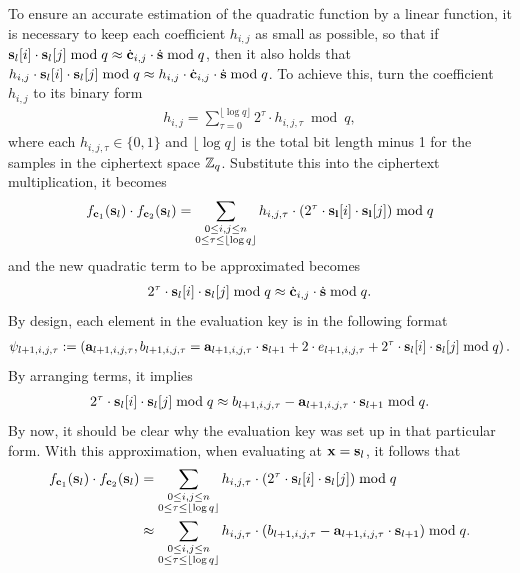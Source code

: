 \documentclass[../main.tex]{subfiles}
\begin{document}
To ensure an accurate estimation of the quadratic function by a linear function, it is necessary to keep each coefficient $h_{i,j}$ as small as possible, so that if $\mathbf{s}_l[i] \cdot \mathbf{s}_l[j] \bmod q \approx \dot{\mathbf{c}}_{i,j} \cdot \dot{\mathbf{s}} \bmod q$, then it also holds that $h_{i,j} \cdot \mathbf{s}_l[i] \cdot \mathbf{s}_l[j] \bmod q \approx h_{i,j} \cdot \dot{\mathbf{c}}_{i,j} \cdot \dot{\mathbf{s}} \bmod q$. To achieve this, turn the coefficient $h_{i,j}$ to its binary form  
\begin{align*}
    h_{i,j} = \sum_{\tau=0}^{\lfloor \log q \rfloor} 2^{\tau} \cdot h_{i,j,\tau} \bmod q,
\end{align*}
where each $h_{i,j,\tau} \in \{0,1\}$ and $\lfloor \log q \rfloor$ is the total bit length minus 1 for the samples in the ciphertext space $\mathbb{Z}_q$. Substitute this into the ciphertext multiplication, it becomes 
\begin{align}
\label{eq:homoMultQuad3}
    f_{\mathbf{c}_1}(\mathbf{s}_l) \cdot f_{\mathbf{c}_2}(\mathbf{s}_l) 
    = \sum_{\substack{0 \le i,j \le n \\ 0 \le \tau \le \lfloor \log q \rfloor}} h_{i,j,\tau} \cdot (2^{\tau} \cdot \mathbf{s_l}[i] \cdot \mathbf{s_l}[j]) \bmod q
\end{align}
and the new quadratic term to be approximated becomes 
\begin{align*}
    2^{\tau} \cdot \mathbf{s}_l[i] \cdot \mathbf{s}_l[j] \bmod q \approx \dot{\mathbf{c}}_{i,j} \cdot \dot{\mathbf{s}} \bmod q.
\end{align*}
By design, each element in the evaluation key is in the following format  
\begin{align*}
        \psi_{l+1,i,j,\tau} := \left( \mathbf{a}_{l+1,i,j,\tau}, b_{l+1,i,j,\tau}=\mathbf{a}_{l+1,i,j,\tau} \cdot \mathbf{s}_{l+1} + 2 \cdot e_{l+1,i,j,\tau} + 2^{\tau} \cdot \mathbf{s}_{l}[i] \cdot \mathbf{s}_{l}[j] \bmod q \right).
\end{align*}
By arranging terms, it implies  
\begin{align*}
    2^{\tau} \cdot \mathbf{s}_l[i] \cdot \mathbf{s}_l[j] \bmod q \approx b_{l+1,i,j,\tau} - \mathbf{a}_{l+1,i,j,\tau} \cdot \mathbf{s}_{l+1} \bmod q.
\end{align*}
By now, it should be clear why the evaluation key was set up in that particular form. With this approximation, when evaluating  at $\mathbf{x}=\mathbf{s}_l$, it follows that 
\begin{align}
\label{eq:homoMultLinear}
    f_{\mathbf{c}_1}(\mathbf{s}_l) \cdot f_{\mathbf{c}_2}(\mathbf{s}_l) 
    &= \sum_{\substack{0 \le i,j \le n \\ 0 \le \tau \le \lfloor \log q \rfloor }} h_{i,j,\tau} \cdot (2^{\tau} \cdot \mathbf{s}_l[i] \cdot \mathbf{s}_l[j]) \bmod q \nonumber \\
    &\approx \sum_{\substack{0 \le i,j \le n \\ 0 \le \tau \le \lfloor \log q \rfloor }} h_{i,j,\tau} \cdot (b_{l+1,i,j,\tau} - \mathbf{a}_{l+1,i,j,\tau} \cdot \mathbf{s}_{l+1}) \bmod q.
\end{align}
\end{document}
